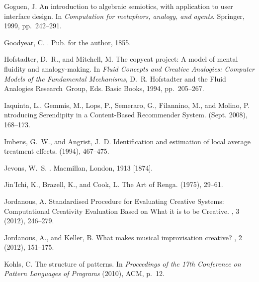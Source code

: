 \begin{thebibliography}{10}
{\sc Goguen, J.}
\newblock An introduction to algebraic semiotics, with application to user
  interface design.
\newblock In {\em Computation for metaphors, analogy, and agents}. Springer,
  1999, pp.~242--291.

{\sc Goodyear, C.}
.
\newblock Pub. for the author, 1855.

{\sc Hofstadter, D.~R., and Mitchell, M.}
\newblock The copycat project: {A} model of mental fluidity and analogy-making.
\newblock In {\em {F}luid {C}oncepts and {C}reative {A}nalogies: {C}omputer
  {M}odels of the {F}undamental {M}echanisms}, D.~R. Hofstadter and the Fluid
  Analogies Research~Group, Eds. Basic Books, 1994, pp.~205--267.

{\sc Iaquinta, L., Gemmis, M., Lops, P., Semeraro, G., Filannino, M., and
  Molino, P.}
ntroducing {S}erendipity in a {C}ontent-{B}ased {R}ecommender
  {S}ystem.
 (Sept. 2008),
  168--173.

{\sc Imbens, G.~W., and Angrist, J.~D.}
\newblock Identification and estimation of local average treatment effects.
 (1994),
  467--475.

{\sc Jevons, W.~S.}
.
\newblock Macmillan, London, {1913 [1874]}.

{\sc Jin'Ichi, K., Brazell, K., and Cook, L.}
\newblock The {A}rt of {R}enga.
 (1975), 29--61.

{\sc Jordanous, A.}
 {S}tandardised {P}rocedure for {E}valuating {C}reative {S}ystems:
  {C}omputational {C}reativity {E}valuation {B}ased on {W}hat it is to be
  {C}reative.
, 3 (2012), 246--279.

{\sc Jordanous, A., and Keller, B.}
\newblock What makes musical improvisation creative?
, 2 (2012),
  151--175.

{\sc Kohls, C.}
\newblock The structure of patterns.
\newblock In {\em {P}roceedings of the 17th {C}onference on {P}attern
  {L}anguages of {P}rograms\/} (2010), ACM, p.~12.


\end{thebibliography}
